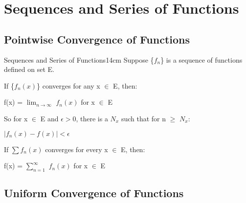 \newpage

\section[Day 14: Sequences \textbackslash \ Series of Functions]
{ Sequences and Series of Functions }

\subsection[ Convergence ]{ Pointwise Convergence of Functions }

    \begin{definition}{Sequences and Series of Functions}{14cm}
        Suppose \{$f_n$\} is a sequence of functions defined on set E.

        If \{$f_n(x)$\} converges for any x $\in$ E, then:

        \hspace{0.5cm}
        f(x) = $\lim_{n \rightarrow \infty}$ $f_n(x)$ for x $\in$ E

        So for x $\in$ E and $\epsilon > 0$, there is a $N_x$ such that
        for n $\geq$ $N_x$:

        \hspace{0.5cm}
        $|f_n(x) - f(x)| < \epsilon$

        \vspace{0.3cm}

        If $\sum f_n(x)$ converges for every x $\in$ E, then:

        \hspace{0.5cm}
        f(x) = $\sum_{n=1}^{\infty}$ $f_n(x)$ for x $\in$ E        
    \end{definition}

    \vspace{0.5cm}





\subsection[ Uniform Convergence ]{ Uniform Convergence of Functions }

